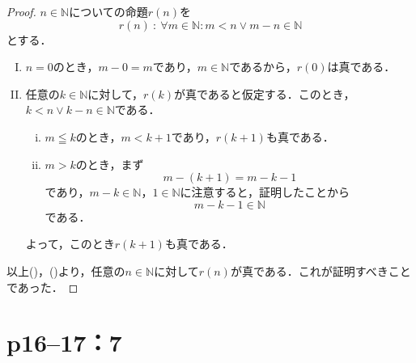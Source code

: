 \newpage


\begin{tleftbar}
    \begin{proof}
        $n \in \mathbb{N}$についての命題$r(n)$を
        \[
            r(n) ~{:}~ \forall m \in \mathbb{N} \colon  m<n \lor m-n  \in \mathbb{N}
        \]
        とする．
        \begin{enumerate}[(I)]
            \item $n=0$のとき，$m - 0 =m$であり，$m \in \mathbb{N}$であるから，$r(0)$は真である．
            \item 任意の$k \in \mathbb{N}$に対して，$r(k)$が真であると仮定する．このとき，$k<n \lor k-n  \in \mathbb{N}$である．
                  \begin{enumerate}[(i)]
                      \item $m \leqq   k$のとき，$m <k+1$であり，$r(k+1)$も真である．
                      \item $m > k$のとき，まず
                            \[
                                m-(k+1)=m-k-1
                            \] であり，$m-k \in \mathbb{N}$，$1 \in \mathbb{N}$に注意すると，証明したことから
                            \[
                                m-k-1  \in \mathbb{N}
                            \]
                            である．
                  \end{enumerate}
                  よって，このとき$r(k+1)$も真である．
        \end{enumerate}
        以上()，()より，任意の$n \in \mathbb{N}$に対して$r(n)$が真である．これが証明すべきことであった．
    \end{proof}
\end{tleftbar}

\newpage

\section*{p16--17：7}

